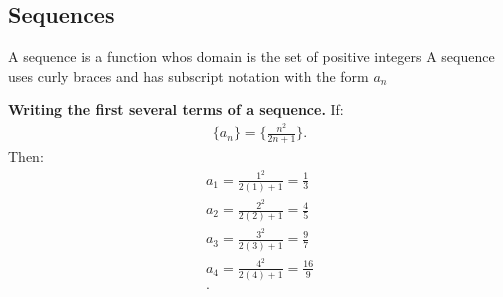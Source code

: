 \documentclass{report}
\begin{document}
    \subsection{
      Sequences
    }

    \bigbreak \noindent 
    \smallbreak \noindent
    \begin{definition}
          A sequence is a function whos domain is the set of positive integers
      A sequence uses curly braces and has subscript notation with the form $a_n$
    \end{definition}
    \begin{figure}[ht]
        \centering
        \label{fig:seq}
    \end{figure}
    \bigbreak \noindent 

    \bigbreak \noindent 
    \begin{mdframed}
      \textbf{Writing the first several terms of a sequence.}
      \bigbreak \noindent 
      If:
      \begin{align*}
        \{a_{n}\} = \bigg\{\frac{n^{2}}{2n+1}\bigg\}
      .\end{align*}
      \bigbreak \noindent 
      Then:
      \begin{align*}
         a_{1} = \frac{1^{2}}{2(1) +1} = \frac{1}{3} \\
         a_{2} = \frac{2^{2}}{2(2)  + 1} = \frac{4}{5}  \\
         a_{3} = \frac{3^{2}}{2(3)  + 1} = \frac{9}{7}  \\
         a_{4} = \frac{4^{2}}{2(4)  + 1} = \frac{16}{9}  \\
      .\end{align*}
    \end{mdframed}
\end{document}
